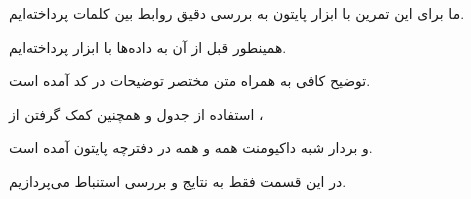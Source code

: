 \begin{boxA}
    ما برای این تمرین با ابزار پایتون به بررسی دقیق روابط بین کلمات پرداخته‌ایم.

    همینطور قبل از آن به 
    داده‌ها با ابزار
    پرداخته‌ایم.

    توضیح کافی به همراه متن مختصر توضیحات در کد آمده است.

    استفاده از جدول 
    و همچنین کمک گرفتن از 
    ،
    
    و بردار شبه داکیومنت همه و همه در دفترچه پایتون آمده است.
    
    در این قسمت فقط به نتایج و بررسی استنباط می‌پردازیم.
\end{boxA}